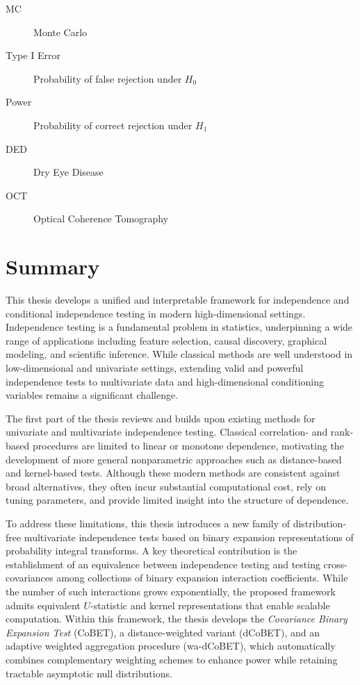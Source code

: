 \documentclass[12pt,reqno,oneside]{amsbook}
\theoremstyle{definition}
\theoremstyle{remark}
\begin{document}
\begin{description}
\item[MC] Monte Carlo
\item[Type I Error] Probability of false rejection under $H_0$
\item[Power] Probability of correct rejection under $H_1$

\item[DED] Dry Eye Disease
\item[OCT] Optical Coherence Tomography

\end{description}



\chapter*{Summary}

This thesis develops a unified and interpretable framework for independence and conditional independence testing in modern high-dimensional settings. Independence testing is a fundamental problem in statistics, underpinning a wide range of applications including feature selection, causal discovery, graphical modeling, and scientific inference. While classical methods are well understood in low-dimensional and univariate settings, extending valid and powerful independence tests to multivariate data and high-dimensional conditioning variables remains a significant challenge.

The first part of the thesis reviews and builds upon existing methods for univariate and multivariate independence testing. Classical correlation- and rank-based procedures are limited to linear or monotone dependence, motivating the development of more general nonparametric approaches such as distance-based and kernel-based tests. Although these modern methods are consistent against broad alternatives, they often incur substantial computational cost, rely on tuning parameters, and provide limited insight into the structure of dependence.

To address these limitations, this thesis introduces a new family of distribution-free multivariate independence tests based on binary expansion representations of probability integral transforms. A key theoretical contribution is the establishment of an equivalence between independence testing and testing cross-covariances among collections of binary expansion interaction coefficients. While the number of such interactions grows exponentially, the proposed framework admits equivalent $U$-statistic and kernel representations that enable scalable computation. Within this framework, the thesis develops the \emph{Covariance Binary Expansion Test} (CoBET), a distance-weighted variant (dCoBET), and an adaptive weighted aggregation procedure (wa-dCoBET), which automatically combines complementary weighting schemes to enhance power while retaining tractable asymptotic null distributions. 
\end{document}
